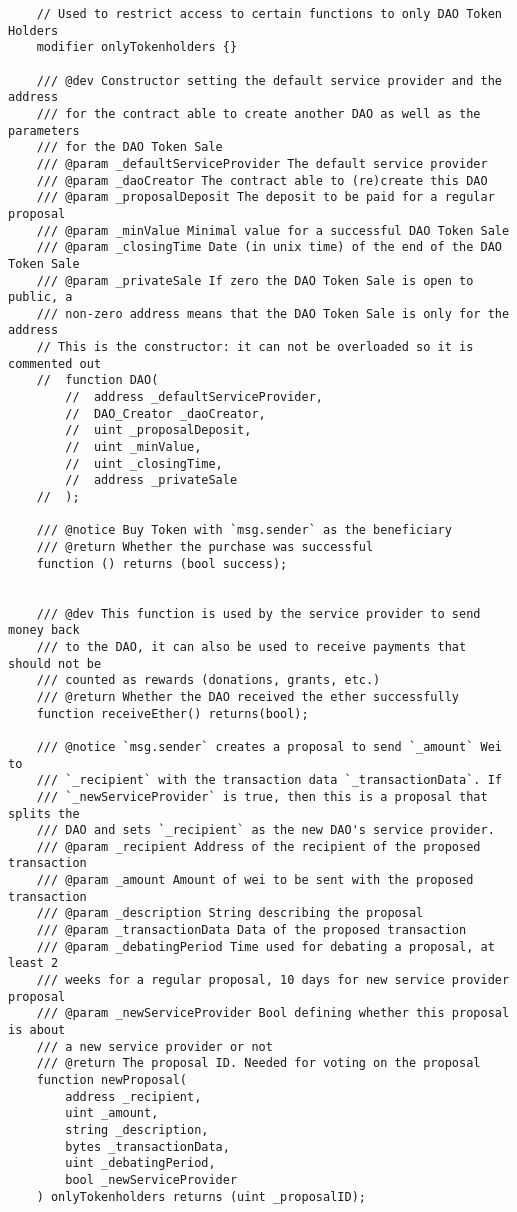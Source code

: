 \documentclass[9pt,oneside]{amsart}
\begin{document}
\begin{appendix}
\begin{verbatim}
    // Used to restrict access to certain functions to only DAO Token Holders
    modifier onlyTokenholders {}

    /// @dev Constructor setting the default service provider and the address
    /// for the contract able to create another DAO as well as the parameters
    /// for the DAO Token Sale
    /// @param _defaultServiceProvider The default service provider
    /// @param _daoCreator The contract able to (re)create this DAO
    /// @param _proposalDeposit The deposit to be paid for a regular proposal
    /// @param _minValue Minimal value for a successful DAO Token Sale
    /// @param _closingTime Date (in unix time) of the end of the DAO Token Sale
    /// @param _privateSale If zero the DAO Token Sale is open to public, a
    /// non-zero address means that the DAO Token Sale is only for the address
    // This is the constructor: it can not be overloaded so it is commented out
    //  function DAO(
        //  address _defaultServiceProvider,
        //  DAO_Creator _daoCreator,
        //  uint _proposalDeposit,
        //  uint _minValue,
        //  uint _closingTime,
        //  address _privateSale
    //  );

    /// @notice Buy Token with `msg.sender` as the beneficiary
    /// @return Whether the purchase was successful
    function () returns (bool success);


    /// @dev This function is used by the service provider to send money back
    /// to the DAO, it can also be used to receive payments that should not be
    /// counted as rewards (donations, grants, etc.)
    /// @return Whether the DAO received the ether successfully
    function receiveEther() returns(bool);

    /// @notice `msg.sender` creates a proposal to send `_amount` Wei to
    /// `_recipient` with the transaction data `_transactionData`. If
    /// `_newServiceProvider` is true, then this is a proposal that splits the
    /// DAO and sets `_recipient` as the new DAO's service provider.
    /// @param _recipient Address of the recipient of the proposed transaction
    /// @param _amount Amount of wei to be sent with the proposed transaction
    /// @param _description String describing the proposal
    /// @param _transactionData Data of the proposed transaction
    /// @param _debatingPeriod Time used for debating a proposal, at least 2
    /// weeks for a regular proposal, 10 days for new service provider proposal
    /// @param _newServiceProvider Bool defining whether this proposal is about
    /// a new service provider or not
    /// @return The proposal ID. Needed for voting on the proposal
    function newProposal(
        address _recipient,
        uint _amount,
        string _description,
        bytes _transactionData,
        uint _debatingPeriod,
        bool _newServiceProvider
    ) onlyTokenholders returns (uint _proposalID);


\end{verbatim}
\end{appendix}
\end{document}
